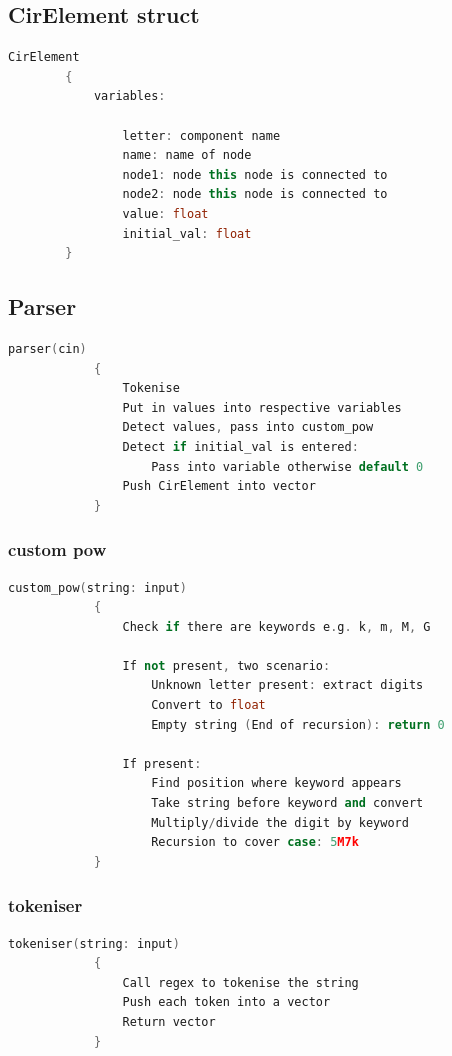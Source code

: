 \documentclass[a4paper, titlepage]{article}
\begin{document}
    \subsection{CirElement struct}
    \begin{lstlisting}[language=C++]
        CirElement 
        {
            variables:
    
                letter: component name
                name: name of node
                node1: node this node is connected to 
                node2: node this node is connected to
                value: float
                initial_val: float
        }
    \end{lstlisting}
    \subsection{Parser}
    \begin{lstlisting}[language=C++]
        parser(cin)
            {
                Tokenise
                Put in values into respective variables
                Detect values, pass into custom_pow
                Detect if initial_val is entered:
                    Pass into variable otherwise default 0
                Push CirElement into vector
            }
    \end{lstlisting}
    \subsubsection{custom pow}

    \begin{lstlisting}[language=C++]
        custom_pow(string: input)
            {
                Check if there are keywords e.g. k, m, M, G
    
                If not present, two scenario:
                    Unknown letter present: extract digits 
                    Convert to float
                    Empty string (End of recursion): return 0
    
                If present:
                    Find position where keyword appears
                    Take string before keyword and convert
                    Multiply/divide the digit by keyword
                    Recursion to cover case: 5M7k
            }
    \end{lstlisting}

    \subsubsection{tokeniser}
    \begin{lstlisting}[language=C++]
        tokeniser(string: input)
            {
                Call regex to tokenise the string 
                Push each token into a vector 
                Return vector
            }
    \end{lstlisting}
\end{document}
